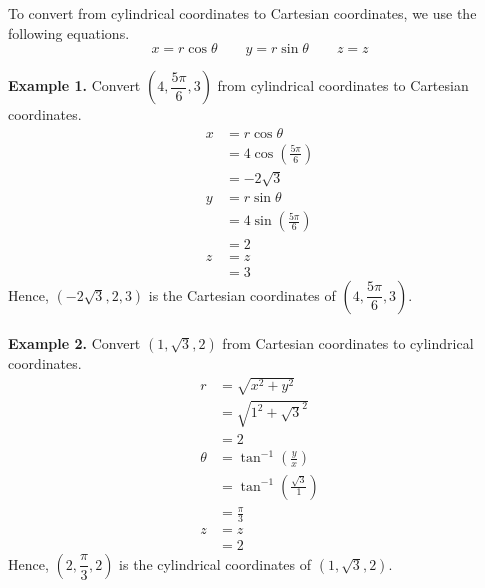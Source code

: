 To convert from cylindrical coordinates to Cartesian coordinates, we use the
following equations. \[x = r\cos\theta \qquad y = r\sin\theta \qquad z = z\]

\noindent\textbf{Example 1. } Convert $\left(4, \dfrac{5\pi}{6}, 3\right)$ from cylindrical coordinates to Cartesian coordinates.
\begin{align*}
    x & = r\cos\theta                      \\
      & = 4\cos\left(\frac{5\pi}{6}\right) \\
      & = -2\sqrt{3}                       \\
    y & = r\sin\theta                      \\
      & = 4\sin\left(\frac{5\pi}{6}\right) \\
      & = 2                                \\
    z & = z                                \\
      & = 3
\end{align*}
Hence, $\left(-2\sqrt{3}, 2, 3\right)$ is the Cartesian coordinates of $\left(4, \dfrac{5\pi}{6}, 3\right)$.
~\\\\
\noindent\textbf{Example 2. } Convert $\left(1, \sqrt{3}, 2\right)$ from Cartesian coordinates to cylindrical coordinates.
\begin{align*}
    r      & = \sqrt{x^2 + y^2}                         \\
           & = \sqrt{1^2 + \sqrt{3}^2}                  \\
           & = 2                                        \\
    \theta & = \tan^{-1}\left(\frac{y}{x}\right)        \\
           & = \tan^{-1}\left(\frac{\sqrt{3}}{1}\right) \\
           & = \frac{\pi}{3}                            \\
    z      & = z                                        \\
           & = 2
\end{align*}
Hence, $\left(2, \dfrac{\pi}{3}, 2\right)$ is the cylindrical coordinates of $\left(1, \sqrt{3}, 2\right)$.
